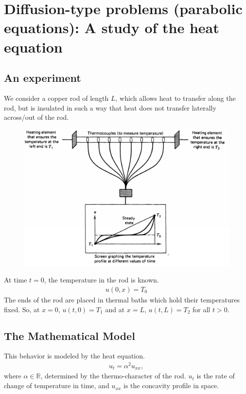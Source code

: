 \documentclass{book}
\theoremstyle{definition}
\begin{document}
\newpage


\chapter{Diffusion-type problems (parabolic equations): A study of the heat equation}
\section{An experiment}
We consider a copper rod of length $L$, which allows heat to transfer along the rod, but is insulated in such a way that heat does not transfer laterally across/out of the rod. 
\begin{figure}[h!]
	\centering
	\includegraphics[scale=0.5]{copper.png}
\end{figure}

At time $t=0$, the temperature in the rod is known.
\begin{align*}
u(0,x) = T_0
\end{align*}
The ends of the rod are placed in thermal baths which hold their temperatures fixed. So, at $x=0$, $u(t,0) = T_1$ and at $x=L$, $u(t,L) = T_2$ for all $t>0$.
\section{The Mathematical Model}
This behavior is modeled by the heat equation. 
\begin{align*}
u_t = \alpha^2 u_{xx},
\end{align*}
where $\alpha \in \mathbb{R}$, determined by the thermo-character of the rod. $u_t$ is the rate of change of temperature in time, and $u_{xx}$ is the concavity profile in space. \\
\end{document}
